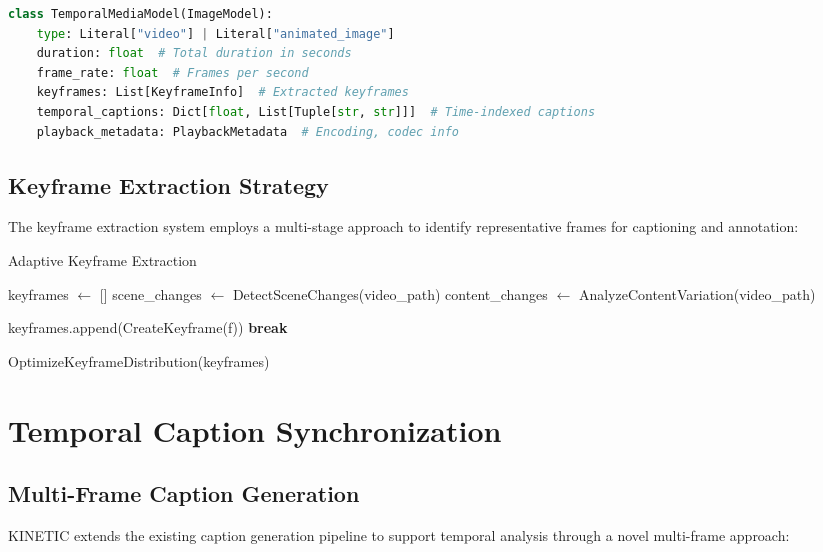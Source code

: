 \documentclass[10pt]{article}
\begin{document}
\begin{lstlisting}[language=Python]
class TemporalMediaModel(ImageModel):
    type: Literal["video"] | Literal["animated_image"]
    duration: float  # Total duration in seconds
    frame_rate: float  # Frames per second
    keyframes: List[KeyframeInfo]  # Extracted keyframes
    temporal_captions: Dict[float, List[Tuple[str, str]]]  # Time-indexed captions
    playback_metadata: PlaybackMetadata  # Encoding, codec info
\end{lstlisting}

\subsection{Keyframe Extraction Strategy}

The keyframe extraction system employs a multi-stage approach to identify representative frames for captioning and annotation:

\begin{algorithm}
\caption{Adaptive Keyframe Extraction}
\begin{algorithmic}[1]
    \State keyframes $\gets$ []
    \State scene\_changes $\gets$ DetectSceneChanges(video\_path)
    \State content\_changes $\gets$ AnalyzeContentVariation(video\_path)
    
            \State keyframes.append(CreateKeyframe(f))
        \EndIf
            \State \textbf{break}
        \EndIf
    \EndFor
    
    \State \Return OptimizeKeyframeDistribution(keyframes)
\EndFunction
\end{algorithmic}
\end{algorithm}

\section{Temporal Caption Synchronization}

\subsection{Multi-Frame Caption Generation}

KINETIC extends the existing caption generation pipeline to support temporal analysis through a novel multi-frame approach:
\end{document}
